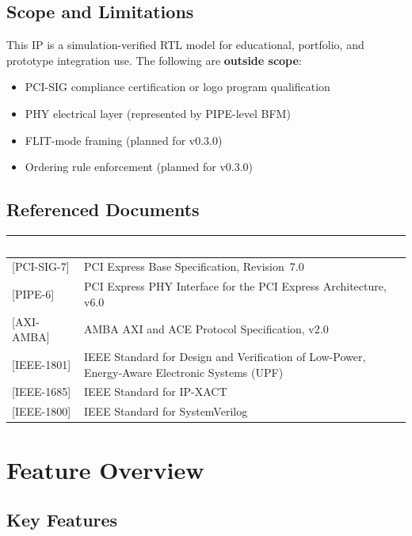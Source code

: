\documentclass[11pt,a4paper]{article}
\newcommand{\theadcell}[1]{%
  \cellcolor{tablehead}\textcolor{white}{\textbf{#1}}}
\begin{document}
\subsection{Scope and Limitations}

This IP is a simulation-verified RTL model for educational, portfolio, and
prototype integration use. The following are \textbf{outside scope}:

\begin{itemize}[noitemsep]
  \item PCI-SIG compliance certification or logo program qualification
  \item PHY electrical layer (represented by PIPE-level BFM)
  \item FLIT-mode framing (planned for v0.3.0)
  \item Ordering rule enforcement (planned for v0.3.0)
\end{itemize}

\subsection{Referenced Documents}

\begin{tabular}{ll}
  \toprule
  \theadcell{Reference} & \theadcell{Document} \\
  \midrule
  {[}PCI-SIG-7{]}  & PCI Express Base Specification, Revision~7.0 \\
  {[}PIPE-6{]}     & PCI Express PHY Interface for the PCI Express Architecture, v6.0 \\
  {[}AXI-AMBA{]}   & AMBA AXI and ACE Protocol Specification, v2.0 \\
  {[}IEEE-1801{]}  & IEEE Standard for Design and Verification of Low-Power, Energy-Aware Electronic Systems (UPF) \\
  {[}IEEE-1685{]}  & IEEE Standard for IP-XACT \\
  {[}IEEE-1800{]}  & IEEE Standard for SystemVerilog \\
  \bottomrule
\end{tabular}

\section{Feature Overview}

\subsection{Key Features}
\end{document}
